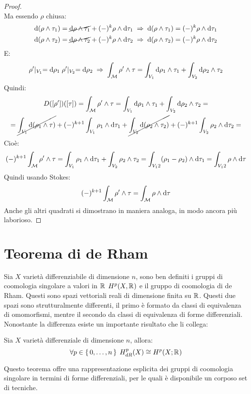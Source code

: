 \begin{proof}
\[  \]
  Ma essendo $ \rho $ chiusa:
  \begin{gather*}
    \d {(\rho \wedge \tau_1)} = \cancel{\d \rho \wedge \tau_1} + (-)^k \rho \wedge \d \tau_1 \; \Rightarrow \; \d {(\rho \wedge \tau_1)} = (-)^k \rho \wedge \d \tau_1 \\
    \d {(\rho \wedge \tau_2)} = \cancel{\d \rho \wedge \tau_2} + (-)^k \rho \wedge \d \tau_2 \; \Rightarrow \; \d {(\rho \wedge \tau_2)} = (-)^k \rho \wedge \d \tau_2
  \end{gather*}
  E:
  \[
    \rho' \lvert_{V_1} = \operatorname{d}\!{\rho}_1 \;   \rho' \lvert_{V_2} = \operatorname{d}\!{\rho}_2 \; \Rightarrow \;  \int_{\mathcal{M}} \rho' \wedge \tau = \int_{V_1} \operatorname{d}\!{\rho}_1 \wedge \tau_1 + \int_{V_2} \operatorname{d}\!{\rho}_2 \wedge \tau_2
  \]
  Quindi:
  \begin{gather*}
    D([\rho'])([\tau]) = \int_{\mathcal{M}} \rho' \wedge \tau = \int_{V_1} \operatorname{d}\!{\rho}_1 \wedge \tau_1 + \int_{V_2} \operatorname{d}\!{\rho}_2 \wedge \tau_2 = \\
    = \cancel{\int_{V_1} \operatorname{d}\!{(\rho_1 \wedge \tau)}} + (-)^{k+1} \int_{V_1} \rho_1 \wedge \operatorname{d}\!{\tau}_1 + \cancel{\int_{V_2} \operatorname{d}\!{(\rho_2 \wedge \tau_2)}} + (-)^{k+1} \int_{V_2} \rho_2 \wedge \operatorname{d}\!{\tau}_2 =
  \end{gather*}
  Cioè:
  \[
    (-)^{k+1} \int_{\mathcal{M}} \rho' \wedge \tau = \int_{V_1} \rho_1 \wedge \operatorname{d}\!{\tau}_1 + \int_{V_2} \rho_2 \wedge \tau_2 = \int_{V_12} (\rho_1 - \rho_2) \wedge \operatorname{d}\!{\tau}_1 = \int_{V_12} \rho \wedge \operatorname{d}\!{\tau}
  \]
  Quindi usando Stokes:
  \[
    (-)^{k+1} \int_{\mathcal{M}} \rho' \wedge \tau = \int_{\mathcal{M}} \rho \wedge \operatorname{d}\!{\tau}
  \]
  Anche gli altri quadrati si dimostrano in maniera analoga, in modo ancora più laborioso.
\end{proof}


\section{Teorema di de Rham}

Sia $ X $ varietà differenziabile di dimensione $ n $, sono ben definiti i
gruppi di coomologia singolare a valori in $ \mathbb{R}^{} $ $ H^p(X, \mathbb{R}^{}) $ e il gruppo di
coomologia di de Rham. Questi sono spazi vettoriali reali di dimensione finita
su $ \mathbb{R}^{} $. Questi due spazi sono strutturalmente differenti, il primo è
formato da classi di equivalenza di omomorfismi, mentre il secondo da classi di
equivalenza di forme differenziali. Nonostante la differenza esiste un importante
risultato che li collega:
\begin{theorem}
  Sia $ X $ varietà differenziale di dimensione $ n $, allora:
  \[
    \forall p \in \set{0, \dots, n} \; H^p_{dR}(X) \cong H^p(X;\mathbb{R}^{})
  \]
\end{theorem}
Questo teorema offre una rappresentazione esplicita dei gruppi di coomologia
singolare in termini di forme differenziali, per le quali è disponibile un corposo
set di tecniche.

